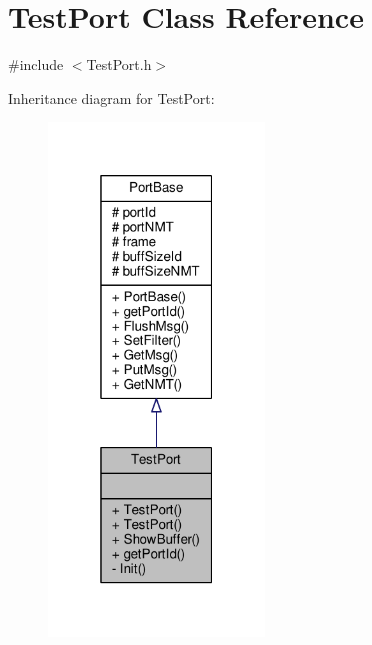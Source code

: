 \hypertarget{classTestPort}{}\section{Test\+Port Class Reference}
\label{classTestPort}


{\ttfamily \#include $<$Test\+Port.\+h$>$}



Inheritance diagram for Test\+Port\+:\nopagebreak
\begin{figure}[H]
\begin{center}
\leavevmode
\includegraphics[width=163pt]{classTestPort__inherit__graph}
\end{center}
\end{figure}


